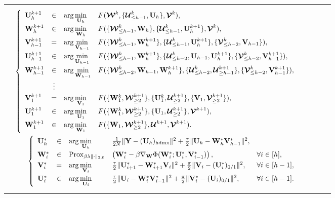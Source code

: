 \documentclass[journal]{IEEEtran}
\newcommand{\ba}{\begin{array}}
\newcommand{\ea}{\end{array}}
\def\U{{\bf U}}
\def\V{{\bf V}}
\def\W{{\bf W}}
\def\Y{{\bf Y}}
\def\CU{{\boldsymbol{\mathcal U}}}
\def\CV{{\boldsymbol{\mathcal V}}}
\def\CW{{\boldsymbol{\mathcal W}}}
\def\hd{{\rm hdmx}}
\begin{document}
\begin{table*}[!htb]
\centering
\begin{tabular}{lcccr}
\parbox{1\textwidth}{ \begin{eqnarray}
\arraycolsep=1.4pt\def\arraystretch{1.25}
\label{Int2}
&&\left\{\ba{lcll}
\U_h^{k+1}&\in&\operatorname{arg} \min\limits_{\U_h}& F(\CW^{k}, \{\CU_{\leq h-1}^{k},\U_h\}, \CV^{k}),\\
\W_h^{k+1}&\in&\operatorname{arg} \min\limits_{\W_h}& F(\{\CW_{\leq h-1}^{k},\W_h\}, \{\CU_{\leq h-1}^{k},\U_h^{k+1}\}, \CV^k),\\
\V_{h-1}^{k+1}&=&\operatorname{arg} \min\limits_{\V_{h-1}}& F(\{\CW_{\leq h-1}^{k},\W_h^{k+1}\}, \{\CU_{\leq h-1}^{k},\U_h^{k+1}\}, \{\CV_{\leq h-2}^{k},\V_{h-1}\}),\\
\U_{h-1}^{k+1}&\in&\operatorname{arg} \min\limits_{\U_{h-1}}& F(\{\CW_{\leq h-1}^{k},\W_h^{k+1}\},  \{\CU_{\leq h-2}^{k},\U_{h-1},\U_h^{k+1}\}, \{\CV_{\leq h-2}^{k},\V_{h-1}^{k+1}\}),\\
\W_{h-1}^{k+1}&\in&\operatorname{arg} \min\limits_{\W_{h-1}}& F(\{\CW_{\leq h-2}^{k},\W_{h-1},\W_h^{k+1}\},  \{\CU_{\leq h-2}^{k},\CU_{\geq h-1}^{k+1}\}, \{\CV_{\leq h-2}^{k},\V_{h-1}^{k+1}\}),\\
&\vdots&\\
\V_{1}^{k+1}&=&\operatorname{arg} \min\limits_{\V_1}& F(\{\W_{1}^{k},\CW_{\geq 2}^{k+1}\},  \{\U_{1}^{k},\CU_{\geq 2}^{k+1}\}, \{\V_1, \CV_{ \geq 2 }^{k+1}\}),\\
\U_{1}^{k+1}&\in&\operatorname{arg} \min\limits_{\U_1}& F(\{\W_{1}^{k},\CW_{\geq 2}^{k+1}\}, \{\U_1,\CU_{\geq 2}^{k+1}\}, \CV^{k+1}),\\
\W_{1}^{k+1}&\in&\operatorname{arg} \min\limits_{\W_1}& F(\{\W_{1},\CW_{\geq 2}^{k+1}\}, \CU^{k+1}, \CV^{k+1}).
\ea\right.\\
\label{G-In3}
&& \left\{\ba{lclll}
\U_{h}^*&\in&\operatorname{arg} \min\limits_{\U_h}  &\frac{1}{2N} \|\Y- (\U_h)_{\hd}\|^{2}+ \frac{\tau}{2} \|\U_h-\W_{h}^*\V_{h-1}^*\|^2,\\
\W_i^*&\in& {\rm Prox}_{\beta \lambda\|\cdot\|_{2,0}}&\left(\W_i^*-\beta \nabla_\W \Phi ( \W_{i}^*; \U_{i}^*,\V_{i-1}^*)  \right), & \forall i\in[h],\\
\V_{i}^*&=&\operatorname{arg} \min\limits_{\V_{i}}& \frac{\tau}{2}\|\U_{i+1}^*-\W_{i+1}^*\V_{i}\|^2+ \frac{\pi}{2}\|\V_{i}-(\U_{i}^*)_{0/1}\|^2, &\forall i\in[h-1],\\
\U_i^*&\in&\operatorname{arg} \min\limits_{\U_i}& \frac{\tau}{2}\|\U_i-\W_i^*\V_{i-1}^*\|^2+  \frac{\pi}{2}\|\V_i^*-(\U_i)_{0/1}\|^2, &\forall i\in[h-1].\\
\ea\right.
\end{eqnarray}} \\\hline
\end{tabular}
\end{table*}
\end{document}
